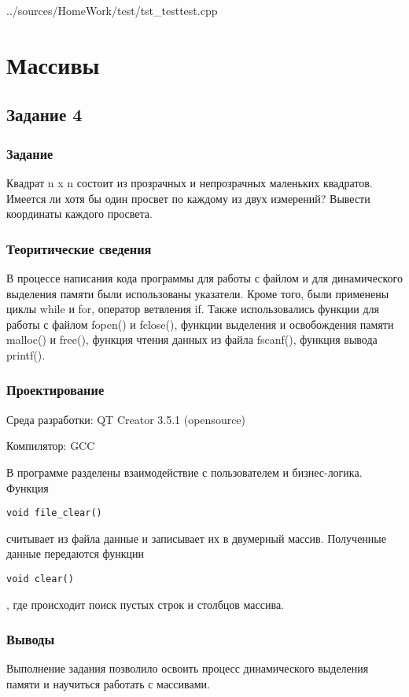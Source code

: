 \documentclass[12pt,a4paper]{report}
\begin{document}

{../sources/HomeWork/test/tst_testtest.cpp}




\chapter{Массивы}
\section{Задание 4}
\subsection{Задание}
Квадрат n x n состоит из прозрачных и непрозрачных маленьких квадратов. Имеется ли хотя бы один просвет по каждому из двух измерений? Вывести координаты каждого просвета.

\subsection{Теоритические сведения}

В процессе написания кода программы для работы с файлом и для динамического выделения памяти были использованы указатели. Кроме того, были применены циклы while и for, оператор ветвления if. Также использовались функции для работы с файлом fopen() и fclose(), функции выделения и освобождения памяти malloc() и free(), функция чтения данных из файла fscanf(), функция вывода printf().

\subsection{Проектирование}
Среда разработки: QT Creator 3.5.1 (opensource)

Компилятор: GCC

В программе разделены взаимодействие с пользователем и бизнес-логика. Функция \begin{verbatim}void file_clear()\end{verbatim} считывает из файла данные и записывает их в двумерный массив. Полученные данные передаются функции \begin{verbatim}void clear() \end{verbatim}, где происходит поиск пустых строк и столбцов массива.

\subsection{Выводы}
Выполнение задания позволило освоить процесс динамического выделения памяти и научиться работать с массивами.
\end{document}
